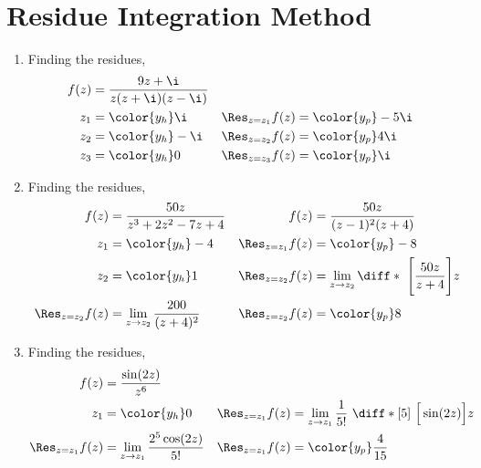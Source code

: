 \section{Residue Integration Method}

\begin{enumerate}
    \item Finding the residues,
          \begin{align}
              f(z)                & = \frac{9z + \i}{z(z + \i)(z - \i)}   \\
              z_1                 & = \color{y_h} \i                    &
              \Res_{z = z_1} f(z) & = \color{y_p} -5\i                    \\
              z_2                 & = \color{y_h} -\i                   &
              \Res_{z = z_2} f(z) & = \color{y_p} 4\i                     \\
              z_3                 & = \color{y_h} 0                     &
              \Res_{z = z_3} f(z) & = \color{y_p} \i
          \end{align}

    \item Finding the residues,
          \begin{align}
              f(z)                & = \frac{50z}{z^3 + 2z^2 - 7z + 4}        &
              f(z)                & = \frac{50z}{(z-1)^2(z + 4)}               \\
              z_1                 & = \color{y_h} -4                         &
              \Res_{z = z_1} f(z) & = \color{y_p} -8                           \\
              z_2                 & = \color{y_h} 1                          &
              \Res_{z = z_2} f(z) & = \lim_{z \to z_2} \diff* {\ \Bigg[
              \frac{50z}{z+4}\Bigg]}{z}                                        \\
              \Res_{z = z_2} f(z) & = \lim_{z \to z_2} \frac{200}{(z + 4)^2} &
              \Res_{z = z_2} f(z) & = \color{y_p} 8
          \end{align}

    \item Finding the residues,
          \begin{align}
              f(z)                & = \frac{\sin(2z)}{z^6}                       \\
              z_1                 & = \color{y_h} 0                            &
              \Res_{z = z_1} f(z) & = \lim_{z \to z_1} \frac{1}{5!}\ \diff*[5]
              {\ \Big[ \sin(2z) \Big]}{z}                                        \\
              \Res_{z = z_1} f(z) & = \lim_{z \to z_1} \frac{2^5\cos(2z)}{5!}  &
              \Res_{z = z_1} f(z) & = \color{y_p} \frac{4}{15}
          \end{align}


\end{enumerate}
